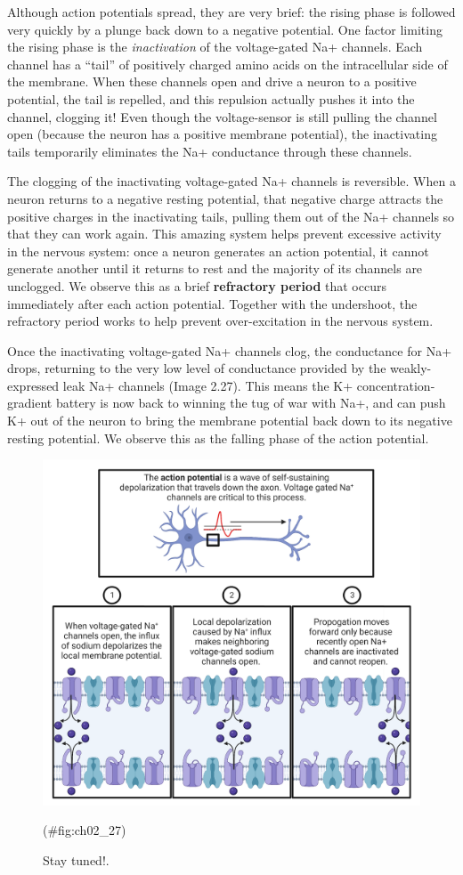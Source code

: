 \documentclass[
]{book}
\begin{document}
Although action potentials spread, they are very brief: the rising phase is followed very quickly by a plunge back down to a negative potential. One factor limiting the rising phase is the \emph{inactivation} of the voltage-gated Na+ channels. Each channel has a ``tail'' of positively charged amino acids on the intracellular side of the membrane. When these channels open and drive a neuron to a positive potential, the tail is repelled, and this repulsion actually pushes it into the channel, clogging it! Even though the voltage-sensor is still pulling the channel open (because the neuron has a positive membrane potential), the inactivating tails temporarily eliminates the Na+ conductance through these channels.

The clogging of the inactivating voltage-gated Na+ channels is reversible. When a neuron returns to a negative resting potential, that negative charge attracts the positive charges in the inactivating tails, pulling them out of the Na+ channels so that they can work again. This amazing system helps prevent excessive activity in the nervous system: once a neuron generates an action potential, it cannot generate another until it returns to rest and the majority of its channels are unclogged. We observe this as a brief \textbf{refractory period }that occurs immediately after each action potential. Together with the undershoot, the refractory period works to help prevent over-excitation in the nervous system.

Once the inactivating voltage-gated Na+ channels clog, the conductance for Na+ drops, returning to the very low level of conductance provided by the weakly-expressed leak Na+ channels (Image 2.27). This means the K+ concentration-gradient battery is now back to winning the tug of war with Na+, and can push K+ out of the neuron to bring the membrane potential back down to its negative resting potential. We observe this as the falling phase of the action potential.

\begin{figure}

{\centering \includegraphics[width=0.8\linewidth]{images/ch02/02_26} 

}

\caption{Stay tuned!.}(\#fig:ch02_27)
\end{figure}
\end{document}
